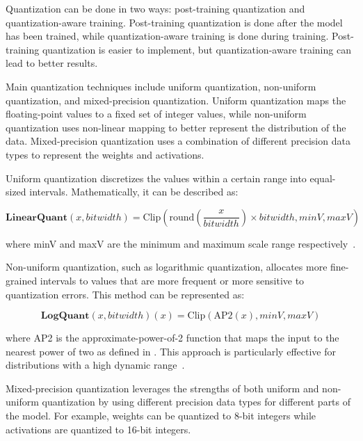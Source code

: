 Quantization can be done in two ways: post-training quantization and quantization-aware training.
Post-training quantization is done after the model has been trained, while quantization-aware training is done during training.
Post-training quantization is easier to implement, but quantization-aware training can lead to better results.

Main quantization techniques include uniform quantization, non-uniform quantization, and mixed-precision quantization.
Uniform quantization maps the floating-point values to a fixed set of integer values, while non-uniform quantization uses non-linear mapping to better represent the distribution of the data.
Mixed-precision quantization uses a combination of different precision data types to represent the weights and activations.

Uniform quantization discretizes the values within a certain range into equal-sized intervals.
Mathematically, it can be described as:

\begin{equation}
	\textbf{LinearQuant}(x, bitwidth) = \text{Clip}(\text{round}(\frac{x}{bitwidth}) \times bitwidth, minV, maxV)
	\label{eq:uniform-quantization}
\end{equation}

\noindent where minV and maxV are the minimum and maximum scale range respectively~\cite{hubara2017quantized}.

Non-uniform quantization, such as logarithmic quantization, allocates more fine-grained intervals to values that are more frequent or more sensitive to quantization errors.
This method can be represented as:

\begin{equation}
	\textbf{LogQuant}(x, bitwidth)(x) = \text{Clip}(\text{AP2}(x), minV, maxV)
	\label{eq:non-uniform-quantization}
\end{equation}

\noindent where AP2 is the approximate-power-of-2 function that maps the input to the nearest power of two as defined in \textcite{hubara2017quantized}.
This approach is particularly effective for distributions with a high dynamic range~\cite{miyashita2016convolutional}.

Mixed-precision quantization leverages the strengths of both uniform and non-uniform quantization by using different precision data types for different parts of the model.
For example, weights can be quantized to 8-bit integers while activations are quantized to 16-bit integers.

